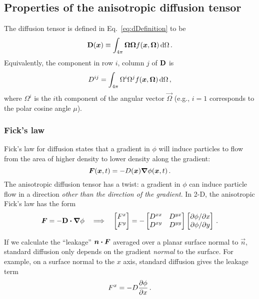 \subsection{Properties of the anisotropic diffusion tensor}
The diffusion tensor is defined in Eq.~\eqref{eq:dDefinition} to be
\begin{equation*}
  \mathbf{D}(\bm{x}) \equiv \int_{4\pi} \bm{\Omega} \bm{\Omega}
  f(\bm{x}, \bm{\Omega}) \mathop{}\!\mathrm{d}\Omega \,.
\end{equation*}
Equivalently, the component in row $i$, column $j$ of $\mathbf{D}$ is
\begin{equation}\label{eq:dij}
  D^{ij} = \int_{4\pi} \Omega^i \Omega^j
  f(\bm{x}, \bm{\Omega}) \mathop{}\!\mathrm{d}\Omega \,,
\end{equation}
where $\Omega^i$ is the $i$th component of the angular vector $\vec{\Omega}$
(e.g., $i=1$ corresponds to the polar cosine angle $\mu$).

\subsubsection{Fick's law}\label{sec:adFicks}
Fick's law for diffusion states that a gradient in $\phi$ will induce particles
to flow from the area of higher density to lower density along the gradient:
\begin{equation*}
  \bm{F}(\bm{x},t) = - D(\bm{x}) \bm{\nabla} \phi(\bm{x},t)\,.
\end{equation*}
The anisotropic diffusion tensor has a twist: a gradient in $\phi$ can induce
particle flow in a direction \emph{other than the direction of the gradient}. In
2-D, the anisotropic Fick's law has the form
\begin{equation*}
  \bm{F} = - \mathbf{D} \bm{\cdot} \bm{\nabla} \phi
  \quad \Longrightarrow \quad
  \begin{bmatrix}
    F^x \\
    F^y
  \end{bmatrix}
  =
  -
  \begin{bmatrix}
    D^{xx} & D^{yx} \\
    D^{xy} & D^{yy}
  \end{bmatrix}
  \begin{bmatrix}
    {\partial \phi}/{\partial x} \\
    {\partial \phi}/{\partial y}
  \end{bmatrix} \,.
\end{equation*}

If we calculate the ``leakage'' $\bm{n} \bm{\cdot} \bm{F}$ averaged over a planar
surface normal to $\vec{n}$, standard diffusion only depends on the gradient
\emph{normal} to the surface. For example, on a surface normal to the $x$ axis,
standard diffusion gives the leakage term
\begin{equation*}
  F^x = - D \frac{\partial \phi}{\partial x}\,.
\end{equation*}

